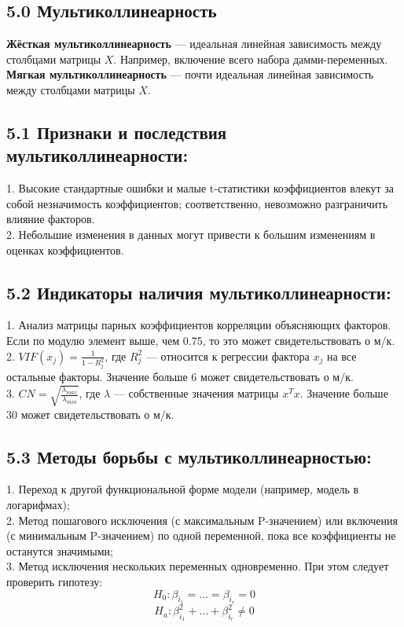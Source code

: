 \documentclass[a0,final]{a0poster}
\begin{document}
\begin{multicols}{4}
\section*{5.0 Мультиколлинеарность}
\begin{tcolorbox}[colback=purple!5!white,colframe=purple!75!black]
\textbf{Жёсткая мультиколлинеарность} — идеальная линейная зависимость между столбцами матрицы $X$. Например, включение всего набора дамми-переменных.\\
\textbf{Мягкая мультиколлинеарность} — почти идеальная линейная зависимость между столбцами матрицы $X$.
\end{tcolorbox}
\subsection*{5.1 Признаки и последствия мультиколлинеарности:}
1. Высокие стандартные ошибки и малые t-статистики коэффициентов влекут за собой незначимость коэффициентов; соответственно, невозможно разграничить влияние факторов. \\
2. Небольшие изменения в данных могут привести к большим изменениям в оценках коэффициентов.
\subsection*{5.2 Индикаторы наличия мультиколлинеарности:}
1. Анализ матрицы парных коэффициентов корреляции объясняющих факторов. Если по модулю элемент выше, чем 0.75, то это может свидетельствовать о м/к. \\
2. $VIF(x_j)= \frac{1}{1-R^2_j}$, где $R^2_j$ — относится к регрессии фактора $x_j$ на все остальные факторы. Значение больше 6 может свидетельствовать о м/к. \\
3. $CN = \sqrt{\frac{\lambda_{max}}{\lambda_{min}}}$, где $\lambda$ — собственные значения матрицы $x^Tx$. Значение больше 30 может свидетельствовать о м/к.
\subsection*{5.3 Методы борьбы с мультиколлинеарностью:}
1. Переход к другой функциональной форме модели (например, модель в логарифмах); \\
2. Метод пошагового исключения (с максимальным P-значением) или включения (с минимальным P-значением) по одной переменной, пока все коэффициенты не останутся значимыми; \\
3. Метод исключения нескольких переменных одновременно. При этом следует проверить гипотезу:
\[H_0: \beta_{i_1}=...=\beta_{i_r}=0\]
\[H_a: \beta^2_{i_1}+ \ldots +\beta^2_{i_r}\ne0\]
\columnbreak


\end{multicols}
\end{document}
